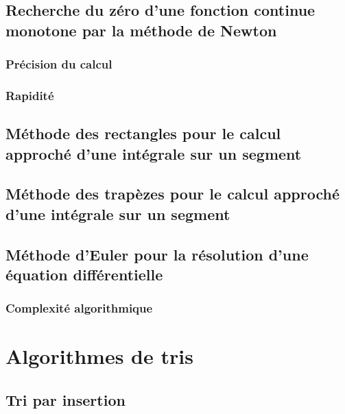 \documentclass[10pt]{article}
\begin{document}
\subsection{Recherche du zéro d'une fonction continue monotone par la méthode de Newton}

\begin{pseudo}
\begin{algorithm}[H]
\end{algorithm}
\end{pseudo}

\subsubsection*{Précision du calcul}
\subsubsection*{Rapidité}

\subsection{Méthode des rectangles pour le calcul approché d'une intégrale sur un segment}
\subsection{Méthode des trapèzes pour le calcul approché d'une intégrale sur un segment}

\subsection{Méthode d'Euler pour la résolution d'une équation différentielle}
\subsubsection*{Complexité algorithmique}


\section{Algorithmes de tris}%
\subsection{Tri par insertion}
\end{document}
